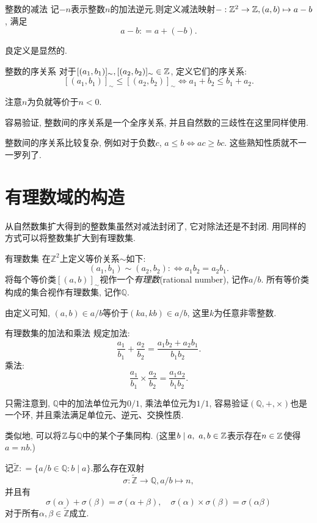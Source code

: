 \begin{definition}{整数的减法}
	记$-n$表示整数$n$的加法逆元.则定义减法映射$-: \mathbb{Z} ^2 \to \mathbb{Z} , (a, b) \mapsto a-b$, 满足$$a-b: =a+(-b).$$
\end{definition}

良定义是显然的.

\begin{definition}{整数的序关系}
	对于$[(a_1, b_1)]_{\sim}, [(a_2, b_2)]_{\sim} \in \mathbb{Z}$, 定义它们的序关系: $$[(a_1, b_1)]_{\sim} \leq [(a_2, b_2)]_{\sim} \Leftrightarrow a_1+b_2 \leq b_1+a_2.$$
\end{definition}

注意$n$为负就等价于$n<0$.

容易验证, 整数间的序关系是一个全序关系, 并且自然数的三歧性在这里同样使用.

整数间的序关系比较复杂, 例如对于负数$c$, $a \leq b \Leftrightarrow ac \geq bc$. 这些熟知性质就不一一罗列了.

\newpage
\section{有理数域的构造}

从自然数集扩大得到的整数集虽然对减法封闭了, 它对除法还是不封闭. 用同样的方式可以将整数集扩大到有理数集.

\begin{definition}{有理数集}
	在$\mathbb{Z}^2$上定义等价关系$\sim$如下: $$(a_1, b_1) \sim (a_2, b_2) : \Leftrightarrow a_1b_2=a_2b_1.$$
	将每个等价类$[(a, b)]_{\sim}$视作一个\textit{有理数}(rational number), 记作$a/b$. 所有等价类构成的集合视作有理数集, 记作$\mathbb{Q}$.
\end{definition}

由定义可知, $(a, b)\in a/b$等价于$(ka, kb) \in a/b$, 这里$k$为任意非零整数. 

\begin{definition}{有理数集的加法和乘法}
	规定加法: $$\frac{a_1}{b_1} + \frac{a_2}{b_2} = \frac{a_1b_2+a_2b_1}{b_1b_2}.$$
	乘法: 
	$$\frac{a_1}{b_1} \times \frac{a_2}{b_2} = \frac{a_1a_2}{b_1b_2}.$$
\end{definition}

只需注意到, $\mathbb{Q}$中的加法单位元为$0/1$, 乘法单位元为$1/1$, 容易验证$(\mathbb{Q}, + ,\times )$也是一个环, 并且乘法满足单位元、逆元、交换性质.

类似地, 可以将$\mathbb{Z}$与$\mathbb{Q}$中的某个子集同构. (这里$b \mid a, ~a, b \in \mathbb{Z}$表示存在$n \in \mathbb{Z}$使得$a=nb$.)

\begin{proposition}{}
	记$\tilde{\mathbb{Z}}: =\{ a/b \in \mathbb{Q}: b \mid a \}$.那么存在双射$$\sigma : \tilde{\mathbb{Z}} \to \mathbb{Q}, a/b \mapsto n, $$
	并且有$$\sigma (\alpha) + \sigma (\beta) = \sigma (\alpha + \beta), \quad \sigma (\alpha) \times \sigma (\beta) = \sigma (\alpha  \beta)$$
	对于所有$\alpha , \beta \in \tilde{\mathbb{Z}}$成立.
\end{proposition}

